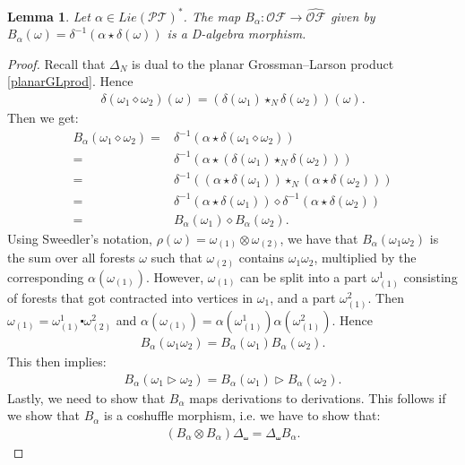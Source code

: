 \documentclass[10pt,a4paper]{article}
\newtheorem{lemma}[theorem]{Lemma}
\DeclareMathOperator{\graft}{\triangleright}
\begin{document}
\begin{lemma}
Let $\alpha\in Lie(\mathcal{PT})^{\ast}$. The map $B_{\alpha}:\mathcal{OF} \to \widehat{\mathcal{OF}}$ given by $B_{\alpha}(\omega)=\delta^{-1}(\alpha \star \delta(\omega))$ is a D-algebra morphism.
\end{lemma}
\begin{proof}
Recall that $\Delta_N$ is dual to the planar Grossman--Larson product \eqref{planarGLprod}. Hence
\begin{align*}
\delta(\omega_1 \diamond \omega_2)(\omega)=(\delta(\omega_1) \star_{N} \delta(\omega_2))(\omega).
\end{align*}
Then we get:
\begin{align*}
B_{\alpha}(\omega_1 \diamond \omega_2)=&\delta^{-1}(\alpha \star \delta(\omega_1 \diamond \omega_2)) \\
=&\delta^{-1}(\alpha \star (\delta(\omega_1) \star_N \delta(\omega_2))) \\
=&\delta^{-1}( (\alpha \star \delta(\omega_1)) \star_N (\alpha \star \delta(\omega_2)  )  ) \\
=&\delta^{-1}(\alpha \star \delta(\omega_1)  ) \diamond \delta^{-1}(\alpha \star \delta(\omega_2)) \\
=&B_{\alpha}(\omega_1) \diamond B_{\alpha}(\omega_2).
\end{align*}
Using Sweedler's notation, $\rho(\omega)=\omega_{(1)} \otimes \omega_{(2)}$, we have that $B_{\alpha}(\omega_1 \omega_2)$ is the sum over all forests $\omega$ such that $\omega_{(2)}$ contains $\omega_1\omega_2$, multiplied by the corresponding $\alpha(\omega_{(1)})$. However, $\omega_{(1)}$ can be split into a part $\omega^1_{(1)}$ consisting of forests that got contracted into vertices in $\omega_1$, and a part $\omega^2_{(1)}$. Then $\omega_{(1)}=\omega^1_{(1)}\centerdot \omega^2_{(2)}$ and $\alpha(\omega_{(1)})=\alpha(\omega^1_{(1)})\alpha(\omega^2_{(1)})$. Hence
\begin{align*}
B_{\alpha}(\omega_1 \omega_2)=B_{\alpha}(\omega_1)B_{\alpha}(\omega_2).
\end{align*}
This then implies:
\begin{align*}
B_{\alpha}(\omega_1 \graft \omega_2)=B_{\alpha}(\omega_1) \graft B_{\alpha}(\omega_2).
\end{align*}
Lastly, we need to show that $B_{\alpha}$ maps derivations to derivations. This follows if we show that $B_{\alpha}$ is a coshuffle morphism, i.e. we have to show that:
\begin{align*}
(B_{\alpha} \otimes B_{\alpha})\Delta_{\shuffle}=\Delta_{\shuffle}B_{\alpha}.

\end{align*}
\end{proof}
\end{document}
